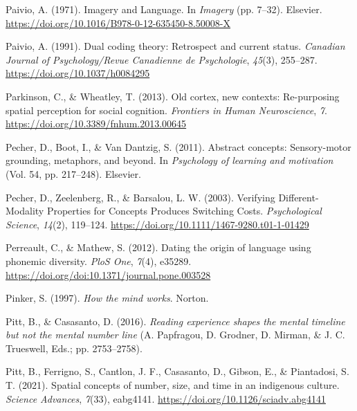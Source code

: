 \documentclass[
  a4paper,12pt,twoside,onecolumn,openright,final,oldfontcommands]{memoir}
\newlength{\cslhangindent}
\newlength{\cslentryspacingunit} %
\newenvironment{CSLReferences}[2] %
 {%
  \setlength{\parindent}{0pt}
  \ifodd #1
  \let\oldpar\par
  \def\par{\hangindent=\cslhangindent\oldpar}
  \fi
  \setlength{\parskip}{#2\cslentryspacingunit}
 }%
 {}
\begin{document}
\begin{CSLReferences}{1}{0}
\leavevmode{}%
Paivio, A. (1971). Imagery and {Language}. In \emph{Imagery} (pp. 7--32). Elsevier. \url{https://doi.org/10.1016/B978-0-12-635450-8.50008-X}

\leavevmode{}%
Paivio, A. (1991). Dual coding theory: {Retrospect} and current status. \emph{Canadian Journal of Psychology/Revue Canadienne de Psychologie}, \emph{45}(3), 255--287. \url{https://doi.org/10.1037/h0084295}

\leavevmode{}%
Parkinson, C., \& Wheatley, T. (2013). Old cortex, new contexts: Re-purposing spatial perception for social cognition. \emph{Frontiers in Human Neuroscience}, \emph{7}. \url{https://doi.org/10.3389/fnhum.2013.00645}

\leavevmode{}%
Pecher, D., Boot, I., \& Van Dantzig, S. (2011). Abstract concepts: {Sensory}-motor grounding, metaphors, and beyond. In \emph{Psychology of learning and motivation} (Vol. 54, pp. 217--248). Elsevier.

\leavevmode{}%
Pecher, D., Zeelenberg, R., \& Barsalou, L. W. (2003). Verifying {Different}-{Modality} {Properties} for {Concepts} {Produces} {Switching} {Costs}. \emph{Psychological Science}, \emph{14}(2), 119--124. \url{https://doi.org/10.1111/1467-9280.t01-1-01429}

\leavevmode{}%
Perreault, C., \& Mathew, S. (2012). Dating the origin of language using phonemic diversity. \emph{PloS One}, \emph{7}(4), e35289. \url{https://doi.org/doi:10.1371/journal.pone.003528}

\leavevmode{}%
Pinker, S. (1997). \emph{How the mind works}. Norton.

\leavevmode{}%
Pitt, B., \& Casasanto, D. (2016). \emph{Reading experience shapes the mental timeline but not the mental number line} (A. Papfragou, D. Grodner, D. Mirman, \& J. C. Trueswell, Eds.; pp. 2753--2758).

\leavevmode{}%
Pitt, B., Ferrigno, S., Cantlon, J. F., Casasanto, D., Gibson, E., \& Piantadosi, S. T. (2021). Spatial concepts of number, size, and time in an indigenous culture. \emph{Science Advances}, \emph{7}(33), eabg4141. \url{https://doi.org/10.1126/sciadv.abg4141}


\end{CSLReferences}
\end{document}
